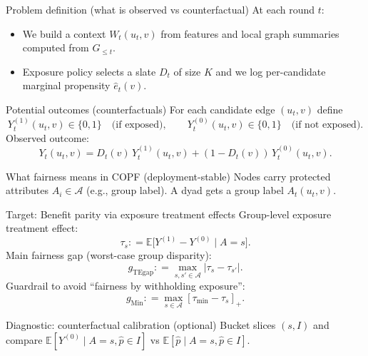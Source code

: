 \documentclass[aspectratio=169,11pt]{beamer}
\newcommand{\1}{\mathbbm{1}}
\newcommand{\E}{\mathbb{E}}
\newcommand{\cA}{\mathcal{A}}
\newcommand{\defeq}{\mathrel{\mathop:}=}
\begin{document}
\begin{frame}{Problem definition (what is observed vs counterfactual)}
\small
At each round $t$:
\begin{itemize}
  \item We build a context $W_t(u_t,v)$ from features and local graph summaries computed from $G_{\le t}$.
  \item Exposure policy selects a slate $D_t$ of size $K$ and we log per-candidate marginal propensity $\hat e_t(v)$.
\end{itemize}
\vspace{0.4em}
\begin{block}{Potential outcomes (counterfactuals)}
\small
For each candidate edge $(u_t,v)$ define
\[
Y_t^{(1)}(u_t,v)\in\{0,1\} \quad\text{(if exposed)}, \qquad
Y_t^{(0)}(u_t,v)\in\{0,1\} \quad\text{(if not exposed)}.
\]
Observed outcome:
\[
Y_t(u_t,v)=D_t(v)\,Y_t^{(1)}(u_t,v) + (1-D_t(v))\,Y_t^{(0)}(u_t,v).
\]
\end{block}
\end{frame}

\begin{frame}{What fairness means in COPF (deployment-stable)}
\small
Nodes carry protected attributes $A_i\in\cA$ (e.g., group label). A dyad gets a group label $A_t(u_t,v)$.
\vspace{0.5em}
\begin{block}{Target: Benefit parity via exposure treatment effects}
\small
Group-level exposure treatment effect:
\[
\tau_s \defeq \E\big[ Y^{(1)}-Y^{(0)} \mid A=s\big].
\]
Main fairness gap (worst-case group disparity):
\[
g_{\mathrm{TEgap}}\defeq\max_{s,s'\in\cA}|\tau_s-\tau_{s'}|.
\]
Guardrail to avoid ``fairness by withholding exposure'':
\[
g_{\mathrm{Min}}\defeq \max_{s\in\cA}[\tau_{\min}-\tau_s]_+.
\]
\end{block}
\vspace{0.2em}
\begin{block}{Diagnostic: counterfactual calibration (optional)}
\small Bucket slices $(s,I)$ and compare $\E[Y^{(0)}\mid A=s,\hat p\in I]$ vs $\E[\hat p\mid A=s,\hat p\in I]$.
\end{block}
\end{frame}
\end{document}
